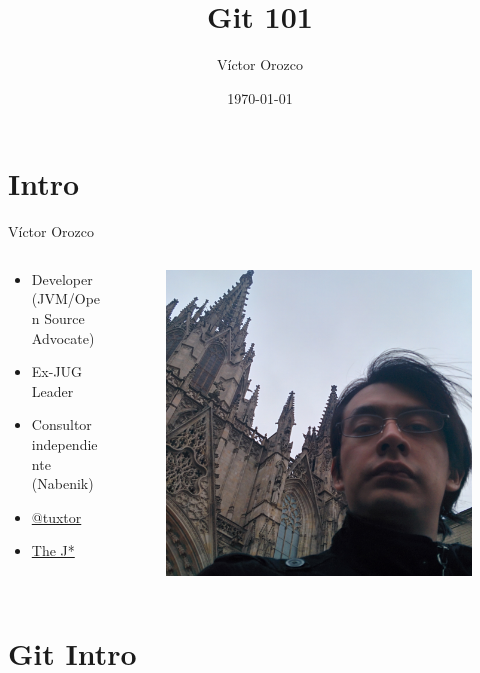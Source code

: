 \documentclass{beamer}
\title{Git 101}
\author{Víctor Orozco}
\institute{GuateJUG}
\date{\today}
\begin{document}
\frame{\titlepage}

\section{Intro}

\begin{frame}{Víctor Orozco}
     \begin{columns}[T] %
	     \begin{column}[T]{5cm} %
				\begin{itemize}
				\item Developer (JVM/Open Source Advocate)
				\item Ex-JUG Leader
				\item Consultor independiente (Nabenik)
				\item \href{https://twitter.com/tuxtor}{@tuxtor}
				\item \href{http://vorozco.com}{The J*} 
				\end{itemize}
	     \end{column}
	     \begin{column}[T]{5cm} %
			\begin{figure}
			\centering
			\includegraphics[width=0.7\linewidth]{Images/barcelona.jpg}
			\end{figure}

	     \end{column}
     \end{columns}
\end{frame}

\section{Git Intro}
\end{document}
